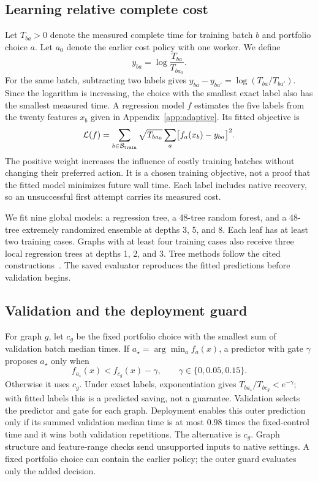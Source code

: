 \subsection{Learning relative complete cost}
Let $T_{ba}>0$ denote the measured complete time for training batch $b$ and portfolio choice $a$. Let $a_0$ denote the earlier cost policy with one worker. We define
\begin{equation}
y_{ba}=\log\frac{T_{ba}}{T_{ba_0}}.
\label{eq:portfolio-label}
\end{equation}
For the same batch, subtracting two labels gives $y_{ba}-y_{ba'}=\log(T_{ba}/T_{ba'})$. Since the logarithm is increasing, the choice with the smallest exact label also has the smallest measured time. A regression model $f$ estimates the five labels from the twenty features $x_b$ given in Appendix~\ref{app:adaptive}. Its fitted objective is
\begin{equation}
\mathcal L(f)=\sum_{b\in\mathcal B_{\rm train}}\sqrt{T_{ba_0}}\sum_a\bigl[f_a(x_b)-y_{ba}\bigr]^2.
\end{equation}
The positive weight increases the influence of costly training batches without changing their preferred action. It is a chosen training objective, not a proof that the fitted model minimizes future wall time. Each label includes native recovery, so an unsuccessful first attempt carries its measured cost.

We fit nine global models: a regression tree, a 48-tree random forest, and a 48-tree extremely randomized ensemble at depths 3, 5, and 8. Each leaf has at least two training cases. Graphs with at least four training cases also receive three local regression trees at depths 1, 2, and 3. Tree methods follow the cited constructions~\cite{CART1984,Breiman2001Forest,Geurts2006ExtraTrees}. The saved evaluator reproduces the fitted predictions before validation begins.

\subsection{Validation and the deployment guard}
For graph $g$, let $c_g$ be the fixed portfolio choice with the smallest sum of validation batch median times. If $a_\star=\arg\min_a f_a(x)$, a predictor with gate $\gamma$ proposes $a_\star$ only when
\begin{equation}
f_{a_\star}(x)<f_{c_g}(x)-\gamma,\qquad \gamma\in\{0,0.05,0.15\}.
\end{equation}
Otherwise it uses $c_g$. Under exact labels, exponentiation gives $T_{ba_\star}/T_{bc_g}<e^{-\gamma}$; with fitted labels this is a predicted saving, not a guarantee. Validation selects the predictor and gate for each graph. Deployment enables this outer prediction only if its summed validation median time is at most $0.98$ times the fixed-control time and it wins both validation repetitions. The alternative is $c_g$. Graph structure and feature-range checks send unsupported inputs to native settings. A fixed portfolio choice can contain the earlier policy; the outer guard evaluates only the added decision.


